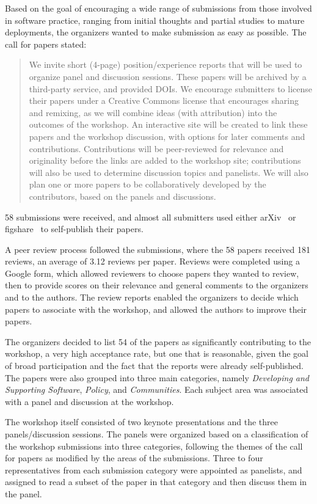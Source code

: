 \documentclass[11pt, oneside]{amsart}
\begin{document}
Based on the goal of encouraging a wide range of submissions from those involved in software practice, ranging from initial thoughts and partial studies to mature deployments, the organizers wanted to make submission as easy as possible. The call for papers stated:

\begin{quote}
We invite short (4-page) position/experience reports that will be used to organize panel and 
discussion sessions. These papers will be archived by a third-party service, and provided DOIs. We 
encourage submitters to license their papers under a Creative Commons license that encourages 
sharing and remixing, as we will combine ideas (with attribution) into the outcomes of the workshop. 
An interactive site will be created to link these papers and the workshop discussion, with options for 
later comments and contributions. Contributions will be peer-reviewed for relevance and originality 
before the links are added to the workshop site; contributions will also be used to determine 
discussion topics and panelists. We will also plan one or more papers to be collaboratively 
developed by the contributors, based on the panels and discussions.
\end{quote}

58 submissions were received, and almost all submitters used either 
arXiv~\cite{arXiv-web} or 
figshare~\cite{figshare-web} to self-publish their papers. 

A peer review process followed the submissions, where the 58 papers received 181 reviews, an 
average of 3.12 reviews per paper. Reviews were completed using a Google form, which allowed 
reviewers to choose papers they wanted to review, then to provide scores on their relevance and general comments to the organizers and to the authors. The review reports enabled the organizers to decide which papers to associate with the workshop, and allowed the authors to improve their papers.

The organizers decided to list 54 of the papers as significantly contributing to the workshop, a very 
high acceptance rate, but one that is reasonable, given the goal of broad participation and the fact 
that the reports were already self-published. The papers were also grouped into three main categories, namely \emph{Developing and Supporting Software}, \emph{Policy}, and \emph{Communities}. Each subject area was associated with a panel and discussion at the workshop.

The workshop itself consisted of two keynote presentations and the three panels/discussion sessions. The panels 
were organized based on a classification of the workshop submissions into three categories, following 
the themes of the call for papers as modified by the areas of the submissions. Three to four representatives from 
each submission category were appointed as panelists, and assigned to read a subset of the paper in that category and then discuss them in the panel.
\end{document}
